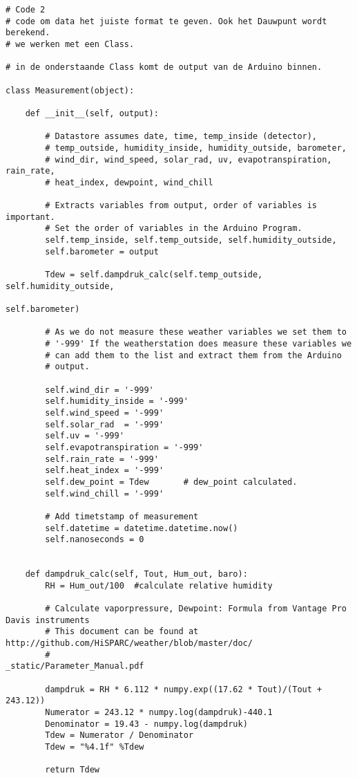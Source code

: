 \begin{verbatim}
# Code 2
# code om data het juiste format te geven. Ook het Dauwpunt wordt berekend.
# we werken met een Class.

# in de onderstaande Class komt de output van de Arduino binnen.

class Measurement(object):

    def __init__(self, output):

        # Datastore assumes date, time, temp_inside (detector),
        # temp_outside, humidity_inside, humidity_outside, barometer,
        # wind_dir, wind_speed, solar_rad, uv, evapotranspiration, rain_rate,
        # heat_index, dewpoint, wind_chill

        # Extracts variables from output, order of variables is important.
        # Set the order of variables in the Arduino Program.
        self.temp_inside, self.temp_outside, self.humidity_outside,
        self.barometer = output

        Tdew = self.dampdruk_calc(self.temp_outside, self.humidity_outside,
                                                            self.barometer)

        # As we do not measure these weather variables we set them to
        # '-999' If the weatherstation does measure these variables we
        # can add them to the list and extract them from the Arduino
        # output.

        self.wind_dir = '-999'
        self.humidity_inside = '-999'
        self.wind_speed = '-999'
        self.solar_rad  = '-999'
        self.uv = '-999'
        self.evapotranspiration = '-999'
        self.rain_rate = '-999'
        self.heat_index = '-999'
        self.dew_point = Tdew       # dew_point calculated.
        self.wind_chill = '-999'

        # Add timetstamp of measurement
        self.datetime = datetime.datetime.now()
        self.nanoseconds = 0


    def dampdruk_calc(self, Tout, Hum_out, baro):
        RH = Hum_out/100  #calculate relative humidity

        # Calculate vaporpressure, Dewpoint: Formula from Vantage Pro Davis instruments
        # This document can be found at http://github.com/HiSPARC/weather/blob/master/doc/
        #                                        _static/Parameter_Manual.pdf

        dampdruk = RH * 6.112 * numpy.exp((17.62 * Tout)/(Tout + 243.12))
        Numerator = 243.12 * numpy.log(dampdruk)-440.1
        Denominator = 19.43 - numpy.log(dampdruk)
        Tdew = Numerator / Denominator
        Tdew = "%4.1f" %Tdew

        return Tdew

\end{verbatim}

